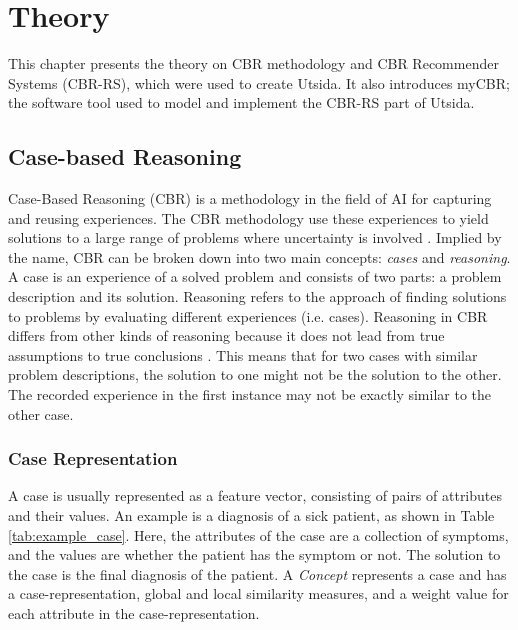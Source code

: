 \cleardoublepage

\chapter{Theory} \label{chap:3}

This chapter presents the theory on CBR methodology and CBR Recommender Systems (CBR-RS), which were used to create Utsida. It also introduces myCBR; the software tool used to model and implement the CBR-RS part of Utsida. 

\section{Case-based Reasoning}

Case-Based Reasoning (CBR) is a methodology in the field of AI for capturing and reusing experiences. The CBR methodology use these experiences to yield solutions to a large range of problems where uncertainty is involved \cite{richter2013case}. Implied by the name, CBR can be broken down into two main concepts: \textit{cases} and \textit{reasoning}. A case is an experience of a solved problem and consists of two parts: a problem description and its solution. Reasoning refers to the approach of finding solutions to problems by evaluating different experiences (i.e. cases). Reasoning in CBR differs from other kinds of reasoning because it does not lead from true assumptions to true conclusions \cite{richter2013case}. This means that for two cases with similar problem descriptions, the solution to one might not be the solution to the other. The recorded experience in the first instance may not be exactly similar to the other case.
    
\subsection{Case Representation}\label{sec:feature_vectors}
A case is usually represented as a feature vector, consisting of pairs of attributes and their values. An example is a diagnosis of a sick patient, as shown in Table \ref{tab:example_case}. Here, the attributes of the case are a collection of symptoms, and the values are whether the patient has the symptom or not. The solution to the case is the final diagnosis of the patient. A \textit{Concept} represents a case and has a case-representation, global and local similarity measures, and a weight value for each attribute in the case-representation.

